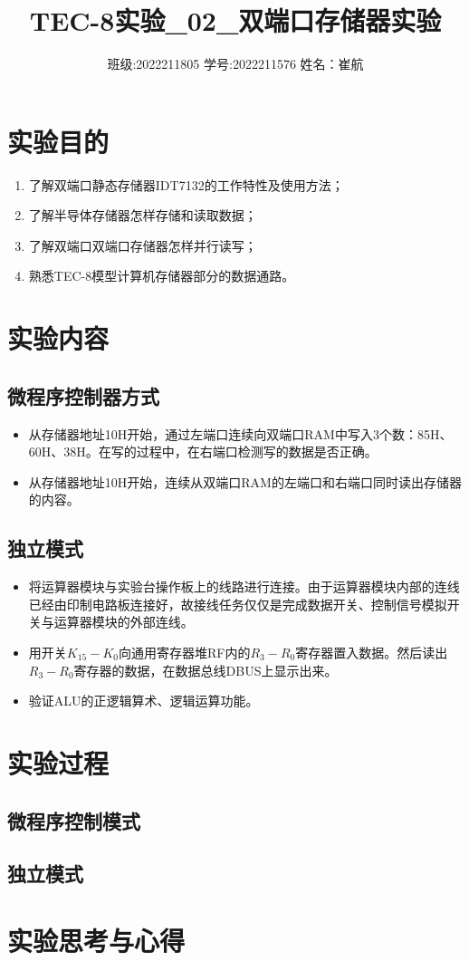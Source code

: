 \documentclass[a4paper]{article}
\title{\heiti\zihao{3} TEC-8实验\_02\_双端口存储器实验}
\date{班级:2022211805  学号:2022211576  姓名：崔航}
\providecommand{\keywords}[1]
{
    \small	
    \textbf{关键词:} #1
}
\providecommand{\keywords}[1]
{
  \small	
  \textbf{关键词:} #1
}
\begin{document}
    \maketitle


\tableofcontents
\newpage

\section{实验目的}
\begin{enumerate}
    
    \item 了解双端口静态存储器IDT7132的工作特性及使用方法；
    \item 了解半导体存储器怎样存储和读取数据；
    \item 了解双端口双端口存储器怎样并行读写；
    \item 熟悉TEC-8模型计算机存储器部分的数据通路。
    
\end{enumerate}

\section{实验内容}
\subsection{微程序控制器方式}
\begin{itemize}
    \item 从存储器地址10H开始，通过左端口连续向双端口RAM中写入3个数：85H、60H、38H。在写的过程中，在右端口检测写的数据是否正确。
    \item 从存储器地址10H开始，连续从双端口RAM的左端口和右端口同时读出存储器的内容。
\end{itemize}
\subsection{独立模式}
\begin {itemize}
    \item 将运算器模块与实验台操作板上的线路进行连接。由于运算器模块内部的连线已经由印制电路板连接好，故接线任务仅仅是完成数据开关、控制信号模拟开关与运算器模块的外部连线。
    \item 用开关$K_{15}-K_{0}$向通用寄存器堆RF内的$R_3-R_0$寄存器置入数据。然后读出$R_3-R_0$寄存器的数据，在数据总线DBUS上显示出来。
    \item 验证ALU的正逻辑算术、逻辑运算功能。
    
\end{itemize}
\section{实验过程}
\subsection{微程序控制模式}

\subsection{独立模式}

\section{实验思考与心得}
\end{document}
